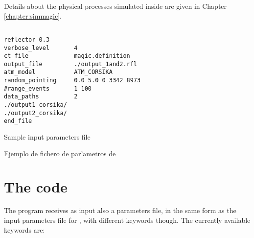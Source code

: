 Details about the physical processes simulated inside  are
given in Chapter \ref{chapter:simmagic}.


\begin{listado}
\begin{verbatim}

reflector 0.3
verbose_level       4 
ct_file             magic.definition 
output_file         ./output_1and2.rfl 
atm_model           ATM_CORSIKA 
random_pointing     0.0 5.0 0 3342 8973 
#range_events       1 100 
data_paths          2 
./output1_corsika/ 
./output2_corsika/ 
end_file 
\end{verbatim}
\ifenglish
\caption{Sample  input parameters file}
\else
\caption{Ejemplo de fichero de par'ametros de }
\fi
\label{fig:reflectorinput}
\end{listado}

\section{The code \camera}
\label{sec:camera}
%
The \camera program receives as input also a parameters file, in the
same form as the input parameters file for , with different
keywords though.  The currently available keywords are:

